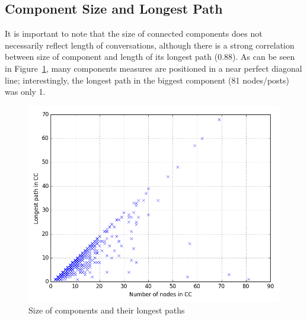 \documentclass[sigconf]{acmart}
\begin{document}
{%

\subsection{Component Size and Longest Path}

It is important to note that the size of connected components does not
necessarily reflect length of conversations, although there is a
strong correlation between size of component and length of its longest
path (0.88). As can be seen in Figure~\ref{fig:ccsizepaths}, many
components measures are positioned in a near perfect diagonal line;
interestingly, the longest path in the biggest component (81
nodes/posts) was only 1.

\begin{figure}[htb]
\centering
\includegraphics[width=\columnwidth]{images/ccsizepaths.png}
\caption{Size of components and their longest paths}
\label{fig:ccsizepaths}
\end{figure}

}
\end{document}
